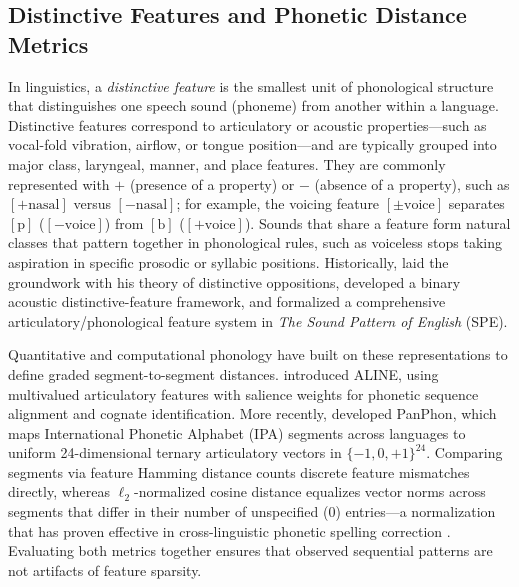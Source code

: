 \documentclass{interact}
\begin{document}
\subsection{Distinctive Features and Phonetic Distance Metrics}
In linguistics, a \emph{distinctive feature} is the smallest unit of phonological structure that distinguishes one speech sound (phoneme) from another within a language. Distinctive features correspond to articulatory or acoustic properties---such as vocal-fold vibration, airflow, or tongue position---and are typically grouped into major class, laryngeal, manner, and place features. They are commonly represented with $+$ (presence of a property) or $-$ (absence of a property), such as $[+\text{nasal}]$ versus $[-\text{nasal}]$; for example, the voicing feature $[\pm\text{voice}]$ separates $[\text{p}]$ ($[-\text{voice}]$) from $[\text{b}]$ ($[+\text{voice}]$). Sounds that share a feature form natural classes that pattern together in phonological rules, such as voiceless stops taking aspiration in specific prosodic or syllabic positions. Historically, \citet{trubetzkoy1939} laid the groundwork with his theory of distinctive oppositions, \citet{jakobson1952} developed a binary acoustic distinctive-feature framework, and \citet{chomsky1968} formalized a comprehensive articulatory/phonological feature system in \emph{The Sound Pattern of English} (SPE).

Quantitative and computational phonology have built on these representations to define graded segment-to-segment distances. \citet{kondrak2003} introduced ALINE, using multivalued articulatory features with salience weights for phonetic sequence alignment and cognate identification. More recently, \citet{mortensen2016panphon} developed PanPhon, which maps International Phonetic Alphabet (IPA) segments across languages to uniform 24-dimensional ternary articulatory vectors in $\{-1, 0, +1\}^{24}$. Comparing segments via feature Hamming distance counts discrete feature mismatches directly, whereas $\ell_2$-normalized cosine distance equalizes vector norms across segments that differ in their number of unspecified ($0$) entries---a normalization that has proven effective in cross-linguistic phonetic spelling correction \citep{mortensen2016panphon}. Evaluating both metrics together ensures that observed sequential patterns are not artifacts of feature sparsity.
\end{document}

